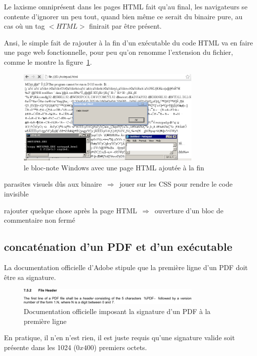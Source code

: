 Le laxisme omniprésent dans les pages HTML fait qu'au final, les navigateurs se contente d'ignorer un peu tout, quand bien même ce serait du binaire pure, au cas où un tag $<HTML>$ finirait par être présent.

Ansi, le simple fait de rajouter à la fin d'un exécutable du code HTML va en faire une page web fonctionnelle, pour peu qu'on renomme l'extension du fichier, comme le montre la figure~\ref{fig:albertini:htmlnotepad}.

\begin{figure}[ht]
  \centering
  \includegraphics[width=0.8\textwidth]{albertini/img/htmlnotepad}
  \caption{le bloc-note Windows avec une page HTML ajoutée à la fin}
  \label{fig:albertini:htmlnotepad}
\end{figure}

parasites visuels dûs aux binaire~$\Rightarrow$~jouer sur les CSS pour rendre le code invisible

rajouter quelque chose après la page HTML~$\Rightarrow$~ouverture d'un bloc de commentaire non fermé

\subsection{concaténation d'un PDF et d'un exécutable}

La documentation officielle d'Adobe stipule que la première ligne d'un PDF doit être sa signature.

\begin{figure}[ht]
  \centering
  \includegraphics[width=0.8\textwidth]{albertini/img/pdfsigtheory}
  \caption{Documentation officielle imposant la signature d'un PDF à la première ligne}
  \label{fig:albertini:pdfsigtheory}
\end{figure}

En pratique, il n'en n'est rien, il est juste requis qu'une signature valide soit présente dans les 1024 ($0x400$) premiers octets.

